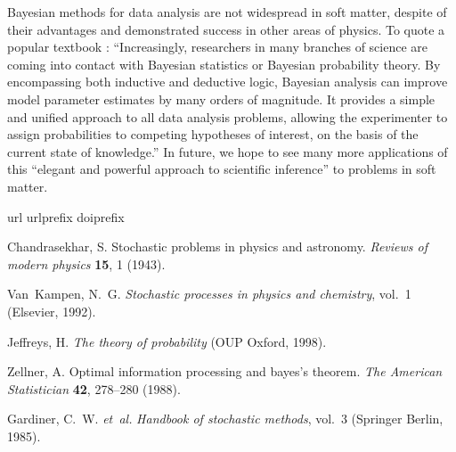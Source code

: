 \documentclass[fleqn,10pt]{wlscirep}
\begin{document}
Bayesian methods for data analysis are not widespread in soft matter,
despite of their advantages and demonstrated success in other areas
of physics. To quote a popular textbook \cite{gregory2005bayesian}:
``Increasingly, researchers in many branches of science are coming
into contact with Bayesian statistics or Bayesian probability theory.
By encompassing both inductive and deductive logic, Bayesian analysis
can improve model parameter estimates by many orders of magnitude.
It provides a simple and unified approach to all data analysis problems,
allowing the experimenter to assign probabilities to competing hypotheses
of interest, on the basis of the current state of knowledge.'' In
future, we hope to see many more applications of this ``elegant and
powerful approach to scientific inference''\cite{gregory2005bayesian}
to problems in soft matter.
\begin{thebibliography}{10}
\expandafter\ifx\csname url\endcsname\relax
  \def\url#1{\texttt{#1}}\fi
\expandafter\ifx\csname urlprefix\endcsname\relax\def\urlprefix{URL }\fi
\expandafter\ifx\csname doiprefix\endcsname\relax\def\doiprefix{DOI }\fi
\providecommand{\bibinfo}[2]{#2}
\providecommand{\eprint}[2][]{\url{#2}}

\bibinfo{author}{Chandrasekhar, S.}
\newblock \bibinfo{title}{Stochastic problems in physics and astronomy}.
\newblock \emph{\bibinfo{journal}{Reviews of modern physics}}
  \textbf{\bibinfo{volume}{15}}, \bibinfo{pages}{1} (\bibinfo{year}{1943}).

\bibinfo{author}{Van~Kampen, N.~G.}
\newblock \emph{\bibinfo{title}{Stochastic processes in physics and
  chemistry}}, vol.~\bibinfo{volume}{1} (\bibinfo{publisher}{Elsevier},
  \bibinfo{year}{1992}).

\bibinfo{author}{Jeffreys, H.}
\newblock \emph{\bibinfo{title}{The theory of probability}}
  (\bibinfo{publisher}{OUP Oxford}, \bibinfo{year}{1998}).

\bibinfo{author}{Zellner, A.}
\newblock \bibinfo{title}{Optimal information processing and bayes's theorem}.
\newblock \emph{\bibinfo{journal}{The American Statistician}}
  \textbf{\bibinfo{volume}{42}}, \bibinfo{pages}{278--280}
  (\bibinfo{year}{1988}).

\bibinfo{author}{Gardiner, C.~W.} \emph{et~al.}
\newblock \emph{\bibinfo{title}{Handbook of stochastic methods}},
  vol.~\bibinfo{volume}{3} (\bibinfo{publisher}{Springer Berlin},
  \bibinfo{year}{1985}).


\end{thebibliography}
\end{document}
